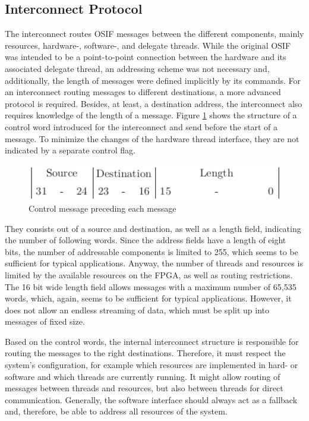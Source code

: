 \subsection{Interconnect Protocol}
The interconnect routes \ac{OSIF} messages between the different components,
mainly resources, hardware-, software-, and delegate threads. While the
original \ac{OSIF} was intended to be a point-to-point connection between the
hardware and its associated delegate thread, an addressing scheme was not
necessary and, additionally, the length of messages were defined implicitly by
its commands. For an interconnect routing messages to different destinations,
a more advanced protocol is required. Besides, at least, a destination
address, the interconnect also requires knowledge of the length of a message.
Figure \ref{fig:proto} shows the structure of a control word introduced for
the interconnect and send before the start of a message. To minimize the
changes of the hardware thread interface, they are not indicated by a separate
control flag.
\begin{figure}[tb]
	\centering
	\includegraphics[width=12cm]{../figures/proto}
	\caption{Control message preceding each message}
	\label{fig:proto}
\end{figure}
They consists out of a source and destination, as well as a length field,
indicating the number of following words. Since the address fields have a
length of eight bits, the number of addressable components is limited to 255,
which seems to be sufficient for typical applications. Anyway, the number of
threads and resources is limited by the available resources on the
\ac{FPGA}, as well as routing restrictions. The 16 bit wide length field
allows messages with a maximum number of 65,535 words, which, again, seems to
be sufficient for typical applications. However, it does not allow an endless
streaming of data, which must be split up into messages of fixed size.

Based on the control words, the internal interconnect structure is responsible
for routing the messages to the right destinations. Therefore, it must respect
the system's configuration, for example which resources are implemented in
hard- or software and which threads are currently running. It might allow
routing of messages between threads and resources, but also between threads
for direct communication. Generally, the software interface should always act
as a fallback and, therefore, be able to address all resources of the system.


